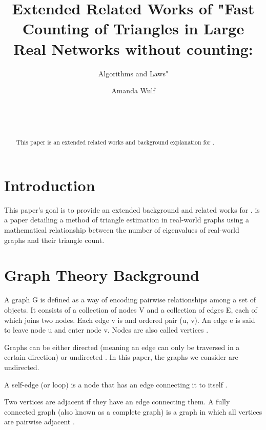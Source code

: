 \documentclass{acm_proc_article-sp}
\begin{document}
\title{Extended Related Works of "Fast Counting of Triangles in Large Real Networks without counting:}
\subtitle{Algorithms and Laws"}

\author{
\alignauthor
Amanda Wulf\\
       \\
       \\
       \\
}

\maketitle
\begin{abstract}
This paper is an extended related works and background explanation for
\cite{original}.
\end{abstract}

\section{Introduction}
This paper's goal is to provide an extended background and related works for
\cite{original}. \cite{original} is a paper detailing a method of triangle
estimation in real-world graphs using a mathematical relationship between the
number of eigenvalues of real-world graphs and their triangle count.

\section{Graph Theory Background}
A graph G is defined as a way of encoding pairwise relationships among a set of
objects. It consists of a collection of nodes V and a collection of edges E, each
of which joins two nodes. Each edge v is and ordered pair (u, v). An edge e is
said to leave node u and enter node v. Nodes are also called vertices
\cite{kleinberg}.

Graphs can be either directed (meaning an edge can only be traversed in a
certain direction) or undirected \cite{kleinberg}. In this paper, the graphs we
consider are undirected.

A self-edge (or loop) is a node that has an edge connecting it to itself
\cite{diestel}.

Two vertices are adjacent if they have an edge connecting them. A fully
connected graph (also known as a complete graph) is a graph in which all
vertices are pairwise adjacent \cite{diestel}.
\end{document}

